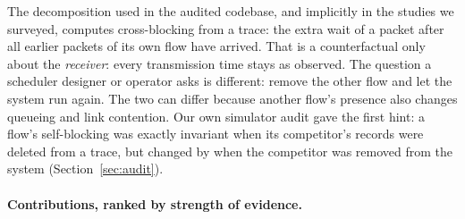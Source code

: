 \documentclass[11pt]{article}
\begin{document}
The decomposition used in the audited codebase, and implicitly in the studies we surveyed, computes cross-blocking from a trace: the extra wait of a packet after all earlier packets of its own flow have arrived.
That is a counterfactual only about the \emph{receiver}: every transmission time stays as observed.
The question a scheduler designer or operator asks is different: remove the other flow and let the system run again.
The two can differ because another flow's presence also changes queueing and link contention.
Our own simulator audit gave the first hint: a flow's self-blocking was exactly invariant when its competitor's records were deleted from a trace, but changed by \HFourRatioFIFO{} when the competitor was removed from the system (Section~\ref{sec:audit}).

\paragraph{Contributions, ranked by strength of evidence.}
\end{document}
